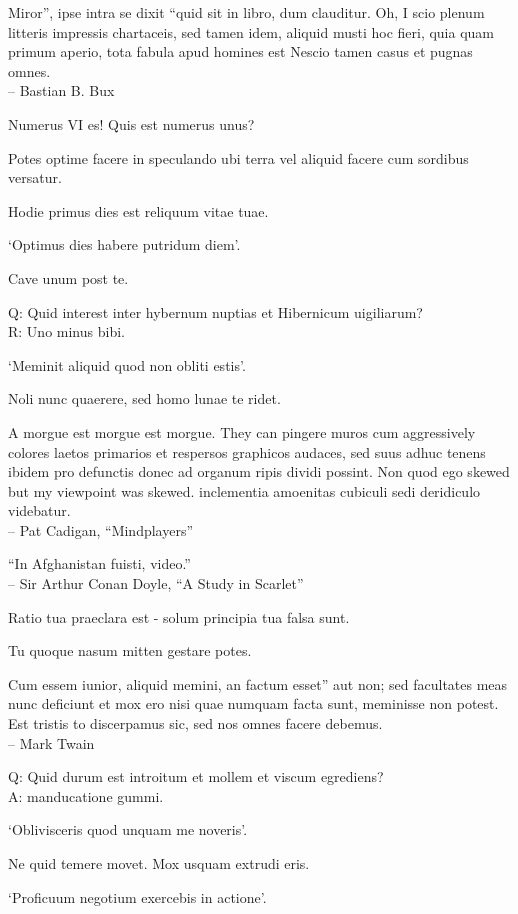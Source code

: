 \documentclass[titlepage,12pt]{memoir}
\begin{document}
Miror”, ipse intra se dixit “quid sit in libro, dum clauditur. Oh, I
scio plenum litteris impressis chartaceis, sed tamen idem, aliquid musti
hoc fieri, quia quam primum aperio, tota fabula apud homines est
Nescio tamen casus et pugnas omnes.
\\-- Bastian B. Bux

Numerus VI es! Quis est numerus unus?

Potes optime facere in speculando ubi terra vel aliquid facere cum sordibus
versatur.

Hodie primus dies est reliquum vitae tuae.

‘Optimus dies habere putridum diem’.

Cave unum post te.

Q: Quid interest inter hybernum nuptias et Hibernicum uigiliarum?\\
R: Uno minus bibi.

‘Meminit aliquid quod non obliti estis’.

Noli nunc quaerere, sed homo lunae te ridet.

A morgue est morgue est morgue. They can pingere muros cum aggressively
colores laetos primarios et respersos graphicos audaces, sed suus adhuc tenens
ibidem pro defunctis donec ad organum ripis dividi possint. Non quod ego
skewed but my viewpoint was skewed. inclementia
amoenitas cubiculi sedi deridiculo videbatur.
\\-- Pat Cadigan, “Mindplayers”

 “In Afghanistan fuisti, video.”
\\-- Sir Arthur Conan Doyle, “A Study in Scarlet”

Ratio tua praeclara est - solum principia tua falsa sunt.

Tu quoque nasum mitten gestare potes.

Cum essem iunior, aliquid memini, an factum esset”
aut non; sed facultates meas nunc deficiunt et mox ero
nisi quae numquam facta sunt, meminisse non potest. Est tristis to
discerpamus sic, sed nos omnes facere debemus.
\\-- Mark Twain

Q: Quid durum est introitum et mollem et viscum egrediens?\\
A: manducatione gummi.

‘Oblivisceris quod unquam me noveris’.

Ne quid temere movet. Mox usquam extrudi eris.

‘Proficuum negotium exercebis in actione’.
\end{document}
